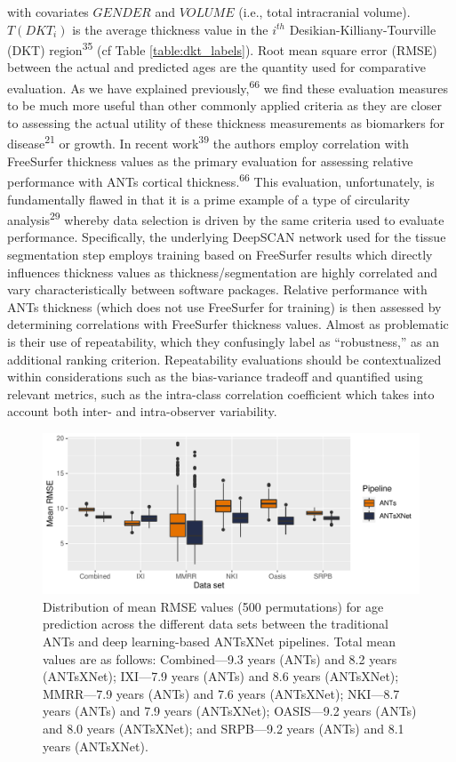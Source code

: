 \documentclass[
  12pt,
]{article}
\begin{document}
with covariates \(GENDER\) and \(VOLUME\) (i.e., total intracranial
volume). \(T(DKT_i)\) is the average thickness value in the \(i^{th}\)
Desikian-Killiany-Tourville (DKT) region\textsuperscript{35} (cf Table
\ref{table:dkt_labels}). Root mean square error (RMSE) between the
actual and predicted ages are the quantity used for comparative
evaluation. As we have explained previously,\textsuperscript{66} we find
these evaluation measures to be much more useful than other commonly
applied criteria as they are closer to assessing the actual utility of
these thickness measurements as biomarkers for
disease\textsuperscript{21} or growth. In recent
work\textsuperscript{39} the authors employ correlation with FreeSurfer
thickness values as the primary evaluation for assessing relative
performance with ANTs cortical thickness.\textsuperscript{66} This
evaluation, unfortunately, is fundamentally flawed in that it is a prime
example of a type of circularity analysis\textsuperscript{29} whereby
data selection is driven by the same criteria used to evaluate
performance. Specifically, the underlying DeepSCAN network used for the
tissue segmentation step employs training based on FreeSurfer results
which directly influences thickness values as thickness/segmentation are
highly correlated and vary characteristically between software packages.
Relative performance with ANTs thickness (which does not use FreeSurfer
for training) is then assessed by determining correlations with
FreeSurfer thickness values. Almost as problematic is their use of
repeatability, which they confusingly label as ``robustness,'' as an
additional ranking criterion. Repeatability evaluations should be
contextualized within considerations such as the bias-variance tradeoff
and quantified using relevant metrics, such as the intra-class
correlation coefficient which takes into account both inter- and
intra-observer variability.

\begin{figure}[htb]
  \centering
    \includegraphics[width=\textwidth]{Figures/rmseThicknessPerSite.pdf}
  \caption{Distribution of mean RMSE values (500 permutations) for age
          prediction across the different data sets between
          the traditional ANTs and deep learning-based ANTsXNet pipelines. Total
          mean values are as follows: Combined---9.3 years (ANTs) and 8.2 years
          (ANTsXNet); IXI---7.9 years (ANTs) and 8.6 years (ANTsXNet);
          MMRR---7.9 years (ANTs) and 7.6 years (ANTsXNet); NKI---8.7 years
          (ANTs) and 7.9 years (ANTsXNet); OASIS---9.2 years (ANTs) and 8.0
          years (ANTsXNet); and SRPB---9.2 years (ANTs) and 8.1 years
          (ANTsXNet).}
  \label{fig:agePrediction}
\end{figure}
\end{document}
